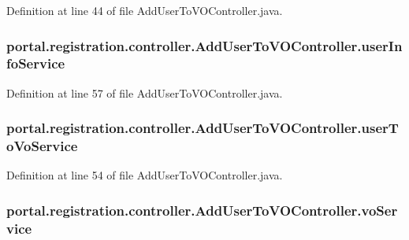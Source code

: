 Definition at line 44 of file AddUserToVOController.java.

\hypertarget{classportal_1_1registration_1_1controller_1_1AddUserToVOController_a49a22ec138007745c8173f2f3da096a0}{
\subsubsection[{userInfoService}]{ {\bf portal.registration.controller.AddUserToVOController.userInfoService}}}
\label{classportal_1_1registration_1_1controller_1_1AddUserToVOController_a49a22ec138007745c8173f2f3da096a0}


Definition at line 57 of file AddUserToVOController.java.

\hypertarget{classportal_1_1registration_1_1controller_1_1AddUserToVOController_ae77dbacf0a44558167aacd12ad393c4a}{
\subsubsection[{userToVoService}]{ {\bf portal.registration.controller.AddUserToVOController.userToVoService}}}
\label{classportal_1_1registration_1_1controller_1_1AddUserToVOController_ae77dbacf0a44558167aacd12ad393c4a}


Definition at line 54 of file AddUserToVOController.java.

\hypertarget{classportal_1_1registration_1_1controller_1_1AddUserToVOController_a066b9dc1ebc1bed7b1a339b08a2f1b63}{
\subsubsection[{voService}]{ {\bf portal.registration.controller.AddUserToVOController.voService}}}
\label{classportal_1_1registration_1_1controller_1_1AddUserToVOController_a066b9dc1ebc1bed7b1a339b08a2f1b63}


